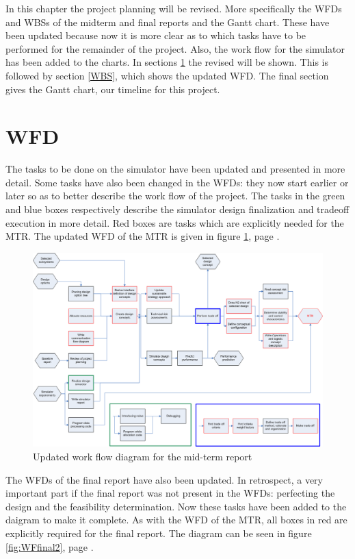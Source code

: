 In this chapter the project planning will be revised. More specifically the \acp{WFD} and \acp{WBS} of the midterm and final reports and the Gantt chart. These have been updated because now it is more clear as to which tasks have to be performed for the remainder of the project. Also, the work flow for the simulator has been added to the charts. In sections \ref{WFD} the revised  will be shown. This is followed by section \ref{WBS}, which shows the updated \acl{WFD}. The final section gives the Gantt chart, our timeline for this project.

\section{\acl{WFD}}
\label{WFD}
The tasks to be done on the simulator have been updated and presented in more detail. Some tasks have also been 
changed in the \acp{WFD}: they now start earlier or later so as to better describe the work flow of the project. 
The tasks in the green and blue boxes respectively describe the simulator design finalization and tradeoff execution in more detail. Red boxes are tasks which are explicitly needed for the \ac{MTR}. The updated \ac{WFD} of the \ac{MTR} is given in figure \ref{fig:WFmidterm2}, page \pageref{fig:WFmidterm2}.

\begin{figure}
\centering
\includegraphics[width=\textheight, angle=90]{chapters/img/Workflow_diagram_MTR_v2.png}
\caption{Updated work flow diagram for the mid-term report}
\label{fig:WFmidterm2}
\end{figure}

The \acp{WFD} of the final report have also been updated. In retrospect, a very important part if the final report was not 
present in the \acp{WFD}: perfecting the design and the feasibility determination. Now these tasks have been added
to the daigram to make it complete. As with the \ac{WFD} of the \ac{MTR}, all boxes in red are explicitly required
for the final report. The diagram can be seen in figure \ref{fig:WFfinal2}, page \pageref{fig:WFfinal2}.

